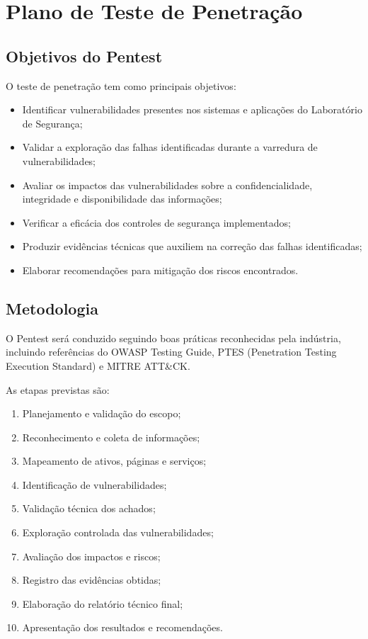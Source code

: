\section{Plano de Teste de Penetração}

\subsection{Objetivos do Pentest}

O teste de penetração tem como principais objetivos:

\begin{itemize}
\item Identificar vulnerabilidades presentes nos sistemas e aplicações do
  Laboratório de Segurança;
\item Validar a exploração das falhas identificadas durante a varredura de
  vulnerabilidades;
\item Avaliar os impactos das vulnerabilidades sobre a confidencialidade,
  integridade e disponibilidade das informações;
\item Verificar a eficácia dos controles de segurança implementados;
\item Produzir evidências técnicas que auxiliem na correção das falhas
  identificadas;
\item Elaborar recomendações para mitigação dos riscos encontrados.
\end{itemize}

\subsection{Metodologia}

O Pentest será conduzido seguindo boas práticas reconhecidas pela indústria,
incluindo referências do OWASP Testing Guide, PTES (Penetration Testing
Execution Standard) e MITRE ATT&CK.

As etapas previstas são:

\begin{enumerate}
\item Planejamento e validação do escopo;
\item Reconhecimento e coleta de informações;
\item Mapeamento de ativos, páginas e serviços;
\item Identificação de vulnerabilidades;
\item Validação técnica dos achados;
\item Exploração controlada das vulnerabilidades;
\item Avaliação dos impactos e riscos;
\item Registro das evidências obtidas;
\item Elaboração do relatório técnico final;
\item Apresentação dos resultados e recomendações.
\end{enumerate}

